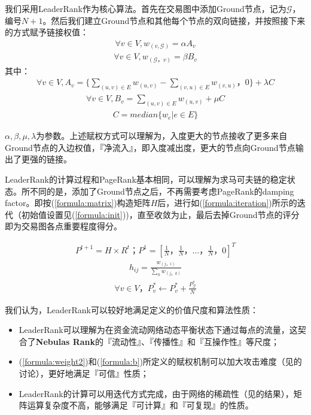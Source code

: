 我们采用LeaderRank\cite{Chen2013}\cite{Li2014}作为核心算法。首先在交易图中添加Ground节点，记为$\mathcal{G}$，编号$N+1$。然后我们建立Ground节点和其他每个节点的双向链接，并按照接下来的方式赋予链接权值：
\begin{align}\label{formula:weight1}
	\forall v \in V, w_{(v, \mathcal{G})} = \alpha A_v
\end{align}
\begin{align}\label{formula:weight2}
\forall v \in V,  w_{(\mathcal{G}， v)} = \beta B_v
\end{align}
其中：
\begin{align}
	\forall v \in V, A_v = \{ \sum_{(u,v)\in E} w_{(u,v)} - \sum_{(v,u) \in E} w_{(v, u)}， 0 \} + \lambda C
\end{align}
\begin{align} \label{formula:b}
\forall v \in V,  B_v =  \sum_{(u,v) \in E} w_{(u,v)} + \mu C
\end{align}
\begin{align}
	C = median\{w_e| e \in E\}
\end{align}

$\alpha, \beta, \mu, \lambda$为参数。上述赋权方式可以理解为，入度更大的节点接收了更多来自Ground节点的入边权值，『净流入』，即入度减出度，更大的节点向Ground节点输出了更强的链接。

LeaderRank的计算过程和PageRank基本相同，可以理解为求马可夫链的稳定状态。所不同的是，添加了Ground节点之后，不再需要考虑PageRank的damping factor\cite{Brin2010}\cite{page1999pagerank}。即按(\ref{formula:matrix})构造矩阵$H$后，进行如(\ref{formula:iteration})所示的迭代（初始值设置见(\ref{formula:init}))，直至收敛为止，最后去掉Ground节点的评分即为交易图各点重要程度得分。

\begin{align} \label{formula:iteration}
	P^{t+1} = H \times R^{t}； P^1=[\frac{1}{N}， \frac{1}{N}， \dots， \frac{1}{N}， 0]^T
\end{align}
\begin{align} \label{formula:matrix}
	h_{ij} = \frac{w_{(j，i)}}{\sum_k w_{(j，k)}}
\end{align}
\begin{align} \label{formula:init}
\forall v \in V， P^*_v \leftarrow P^*_v + \frac{P^*_{\mathcal{G}}}{N}
\end{align}


我们认为，LeaderRank可以较好地满足定义的价值尺度和算法性质：
\begin{itemize}
	\item LeaderRank可以理解为在资金流动网络动态平衡状态下通过每点的流量，这契合了\textbf{Nebulas Rank}的『流动性』、『传播性』和『互操作性』等尺度；
	\item (\ref{formula:weight2})和(\ref{formula:b})所定义的赋权机制可以加大攻击难度（见的讨论），更好地满足『可信』性质；
	\item LeaderRank的计算可以用迭代方式完成，由于网络的稀疏性（见的结果），矩阵运算复杂度不高，能够满足『可计算』和『可复现』的性质。
\end{itemize}


